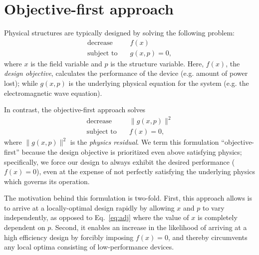 \documentclass[letterpaper,10pt]{article}
\begin{document}
\section{Objective-first approach}
Physical structures are typically designed by solving the following problem:
    \begin{subequations}\label{eq:adj}
    \begin{align} 
    \text{decrease} & \quad f(x) \label{eq:adj:obj} \\ 
    \text{subject to} & \quad g(x,p) = 0, \label{eq:adj:con}
    \end{align}
    \end{subequations}
    where $x$ is the field variable and $p$ is the structure variable.
Here, $f(x)$, the \emph{design objective}, 
    calculates the performance of the device 
    (e.g. amount of power lost); 
    while $g(x,p)$ is the underlying physical equation for the system
    (e.g. the electromagnetic wave equation).

In contrast, the objective-first approach solves 
    \begin{subequations}\label{eq:ob1}
    \begin{align} 
    \text{decrease} & \quad \|g(x,p)\|^2 \label{eq:ob1:obj} \\ 
    \text{subject to} & \quad f(x) = 0, \label{eq:ob1:con}
    \end{align}
    \end{subequations}
    where $\|g(x,p)\|^2$ is the \emph{physics residual}.
We term this formulation ``objective-first''
    because the design objective is prioritized even above satisfying physics;
    specifically, we force our design to always exhibit the desired performance
    ($f(x) = 0$), even at the expense of
    not perfectly satisfying the underlying physics which governs its operation.

The motivation behind this formulation is two-fold.
First, this approach allows is to arrive at a locally-optimal design rapidly 
    by allowing $x$ and $p$ to vary independently, 
    as opposed to Eq.~\ref{eq:adj}
    where the value of $x$ is completely dependent on $p$.
Second, it enables an increase in the likelihood of 
    arriving at a high efficiency design
    by forcibly imposing $f(x) = 0$,
    and thereby circumvents any local optima consisting of
    low-performance devices.
\end{document}
